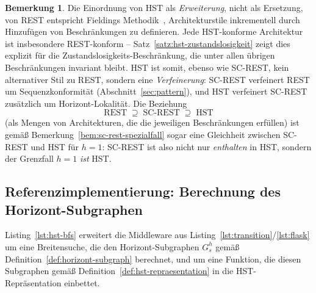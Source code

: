 ﻿\documentclass[a4paper,12pt]{article}
\theoremstyle{definition}
\newtheorem{bemerkung}{Bemerkung}
\begin{document}
\begin{bemerkung}
	Die Einordnung von HST als \emph{Erweiterung}, nicht als Ersetzung, von REST
	entspricht Fieldings Methodik~\cite{fielding2000}, Architekturstile inkrementell
	durch Hinzufügen von Beschränkungen zu definieren. Jede HST-konforme Architektur ist
	insbesondere REST-konform -- Satz~\ref{satz:hst-zustandslosigkeit} zeigt dies
	explizit für die Zustandslosigkeits-Beschränkung, die unter allen übrigen
	Beschränkungen invariant bleibt. HST ist somit, ebenso wie SC-REST, kein
	alternativer Stil zu REST, sondern eine \emph{Verfeinerung}: SC-REST verfeinert REST
	um Sequenzkonformität (Abschnitt~\ref{sec:pattern}), und HST verfeinert SC-REST
	zusätzlich um Horizont-Lokalität. Die Beziehung
	\[
		\text{REST} \;\supseteq\; \text{SC-REST} \;\supseteq\; \text{HST}
	\]
	(als Mengen von Architekturen, die die jeweiligen Beschränkungen erfüllen) ist
	gemäß Bemerkung~\ref{bem:sc-rest-spezialfall} sogar eine Gleichheit zwischen
	SC-REST und HST für $h=1$: SC-REST ist also nicht nur \emph{enthalten} in HST,
	sondern der Grenzfall $h=1$ \emph{ist} HST.
\end{bemerkung}

\subsection{Referenzimplementierung: Berechnung des Horizont-Subgraphen}
\label{sec:hst-implementierung}

Listing~\ref{lst:hst-bfs} erweitert die Middleware aus
Listing~\ref{lst:transition}/\ref{lst:flask} um eine Breitensuche, die den
Horizont-Subgraphen $G_s^h$ gemäß Definition~\ref{def:horizont-subgraph} berechnet, und
um eine Funktion, die diesen Subgraphen gemäß Definition~\ref{def:hst-repraesentation} in
die HST-Repräsentation einbettet.
\end{document}
